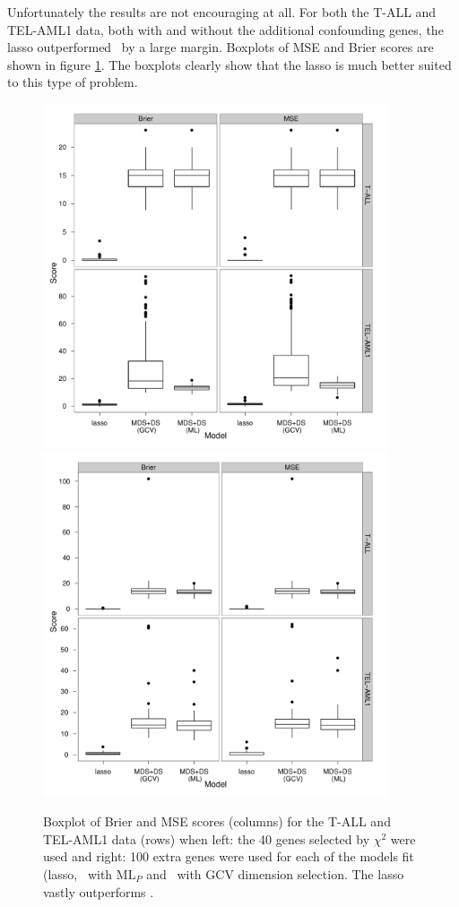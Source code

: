 Unfortunately the results are not encouraging at all. For both the T-ALL and TEL-AML1 data, both with and without the additional confounding genes, the lasso outperformed \mdsds\ by a large margin. Boxplots of MSE and Brier scores are shown in figure \ref{leuk-sim-boxplot}. The boxplots clearly show that the lasso is much better suited to this type of problem.

\begin{figure}
\centering
\includegraphics[width=4in]{gds/figs/sim-msebrier.pdf} \includegraphics[width=4in]{gds/figs/confsim-msebrier.pdf} \\
\caption{Boxplot of Brier and MSE scores (columns) for the T-ALL and TEL-AML1 data (rows) when left: the 40 genes selected by $\chi^2$ were used and right: 100 extra genes were used for each of the models fit (lasso, \mdsds\ with $\text{ML}_P$ and \mdsds\ with GCV dimension selection. The lasso vastly outperforms \mdsds.}
\label{leuk-sim-boxplot}
\end{figure}


